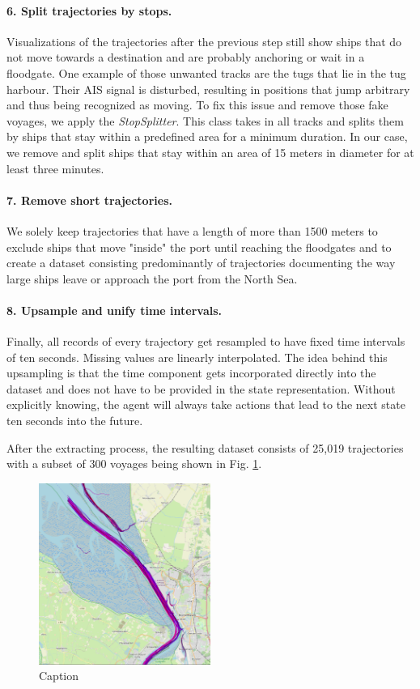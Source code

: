 \paragraph{6. Split trajectories by stops.}
Visualizations of the trajectories after the previous step still show ships that do not move towards a destination and are probably anchoring or wait in a floodgate. One example of those unwanted tracks are the tugs that lie in the tug harbour. Their AIS signal is disturbed, resulting in positions that jump arbitrary and thus being recognized as moving. To fix this issue and remove those fake voyages, we apply the \textit{StopSplitter}. This class takes in all tracks and splits them by ships that stay within a predefined area for a minimum duration. In our case, we remove and split ships that stay within an area of 15 meters in diameter for at least three minutes.


\paragraph{7. Remove short trajectories.}
We solely keep trajectories that have a length of more than 1500 meters to  exclude ships that move "inside" the port until reaching the floodgates and to create a dataset consisting predominantly of trajectories documenting the way large ships leave or approach the port from the North Sea.

\paragraph{8. Upsample and unify time intervals.}
Finally, all records of every trajectory get resampled to have fixed time intervals of ten seconds. Missing values are linearly interpolated. The idea behind this upsampling is that the time component gets incorporated directly into the dataset and does not have to be provided in the state representation. Without explicitly knowing, the agent will always take actions that lead to the next state ten seconds into the future.
\par

After the extracting process, the resulting dataset consists of 25,019 trajectories with a subset of 300 voyages being shown in Fig. \ref{fig:tracks}.

\begin{figure}[H]
    \centering
    \includegraphics[width=0.5\textwidth]{images/all_ships_partial.PNG}
    \caption{Caption}
    \label{fig:tracks}
\end{figure}